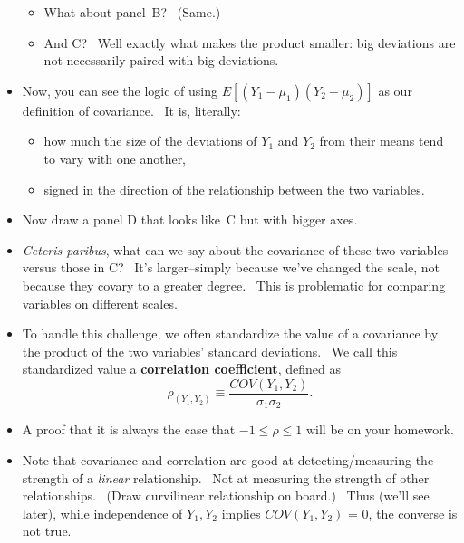 \documentclass[11pt]{article}
\begin{document}
\begin{itemize}
\begin{itemize}
\item What about panel\ B? \ (Same.)

\item And C? \ Well exactly what makes the product smaller: big deviations
are not necessarily paired with big deviations.
\end{itemize}

\item Now, you can see the logic of using $E[(Y_{1}-\mu _{1})(Y_{2}-\mu
_{2})]$ as our definition of covariance. \ It is, literally:

\begin{itemize}
\item how much the size of the deviations of $Y_{1}$ and $Y_{2}$ from their
means tend to vary with one another,

\item signed in the direction of the relationship between the two variables.
\end{itemize}

\item Now draw a panel D that looks like\ C but with bigger axes.

\item \textit{Ceteris paribus}, what can we say about the covariance of
these two variables versus those in C? \ It's larger--simply because we've
changed the scale, not because they covary to a greater degree. \ This is
problematic for comparing variables on different scales.

\item To handle this challenge, we often standardize the value of a
covariance by the product of the two variables' standard deviations. \ We
call this standardized value a \textbf{correlation coefficient}, defined as%
\begin{equation*}
\rho _{(Y_{1},Y_{2})}\equiv \frac{COV(Y_{1},Y_{2})}{\sigma _{1}\sigma _{2}}.
\end{equation*}

\item A proof that it is always the case that $-1\leq \rho \leq 1$ will be
on your homework.

\item Note that covariance and correlation are good at detecting/measuring
the strength of a \textit{linear} relationship. \ Not at measuring the
strength of other relationships. \ (Draw curvilinear relationship on board.)
\ Thus (we'll see later), while independence of $Y_{1},Y_{2}$ implies $%
COV(Y_{1},Y_{2})$ = 0, the converse is not true.
\end{itemize}
\end{document}
